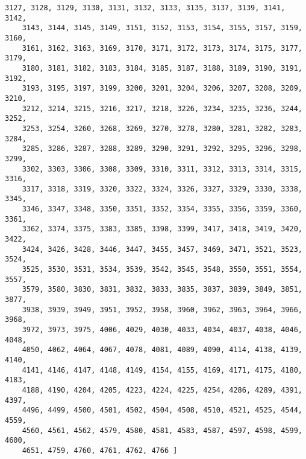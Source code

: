 \documentclass[a4paper,11pt]{report}
\begin{document}
{{\begin{Verbatim}[commandchars=!@|,fontsize=\small,frame=single,label=Example]
    3127, 3128, 3129, 3130, 3131, 3132, 3133, 3135, 3137, 3139, 3141, 3142,
    3143, 3144, 3145, 3149, 3151, 3152, 3153, 3154, 3155, 3157, 3159, 3160,
    3161, 3162, 3163, 3169, 3170, 3171, 3172, 3173, 3174, 3175, 3177, 3179,
    3180, 3181, 3182, 3183, 3184, 3185, 3187, 3188, 3189, 3190, 3191, 3192,
    3193, 3195, 3197, 3199, 3200, 3201, 3204, 3206, 3207, 3208, 3209, 3210,
    3212, 3214, 3215, 3216, 3217, 3218, 3226, 3234, 3235, 3236, 3244, 3252,
    3253, 3254, 3260, 3268, 3269, 3270, 3278, 3280, 3281, 3282, 3283, 3284,
    3285, 3286, 3287, 3288, 3289, 3290, 3291, 3292, 3295, 3296, 3298, 3299,
    3302, 3303, 3306, 3308, 3309, 3310, 3311, 3312, 3313, 3314, 3315, 3316,
    3317, 3318, 3319, 3320, 3322, 3324, 3326, 3327, 3329, 3330, 3338, 3345,
    3346, 3347, 3348, 3350, 3351, 3352, 3354, 3355, 3356, 3359, 3360, 3361,
    3362, 3374, 3375, 3383, 3385, 3398, 3399, 3417, 3418, 3419, 3420, 3422,
    3424, 3426, 3428, 3446, 3447, 3455, 3457, 3469, 3471, 3521, 3523, 3524,
    3525, 3530, 3531, 3534, 3539, 3542, 3545, 3548, 3550, 3551, 3554, 3557,
    3579, 3580, 3830, 3831, 3832, 3833, 3835, 3837, 3839, 3849, 3851, 3877,
    3938, 3939, 3949, 3951, 3952, 3958, 3960, 3962, 3963, 3964, 3966, 3968,
    3972, 3973, 3975, 4006, 4029, 4030, 4033, 4034, 4037, 4038, 4046, 4048,
    4050, 4062, 4064, 4067, 4078, 4081, 4089, 4090, 4114, 4138, 4139, 4140,
    4141, 4146, 4147, 4148, 4149, 4154, 4155, 4169, 4171, 4175, 4180, 4183,
    4188, 4190, 4204, 4205, 4223, 4224, 4225, 4254, 4286, 4289, 4391, 4397,
    4496, 4499, 4500, 4501, 4502, 4504, 4508, 4510, 4521, 4525, 4544, 4559,
    4560, 4561, 4562, 4579, 4580, 4581, 4583, 4587, 4597, 4598, 4599, 4600,
    4651, 4759, 4760, 4761, 4762, 4766 ]
  
  
\end{Verbatim}
 }

 }

 
\end{document}
